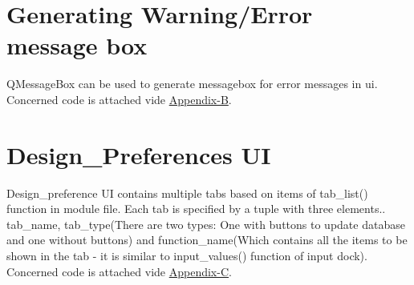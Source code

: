 \documentclass[11pt,a4paper]{report}
\begin{document}
\section{Generating Warning/Error message box}
\noindent QMessageBox can be used to generate messagebox for error messages in ui. Concerned code is attached vide \hyperlink {page.11}{Appendix-B}.

\section{Design\_Preferences UI}
\noindent Design\_preference UI contains multiple tabs based on items of tab\_list() function in module file. Each tab is specified by a tuple with three elements.. tab\_name, tab\_type(There are two types: One with buttons to update database and one without buttons) and function\_name(Which contains all the items to be shown in the tab - it is similar to input\_values() function of input dock). Concerned code is attached vide \hyperlink {page.12}{Appendix-C}.

\nocite{*}
\newpage


\end{document}
